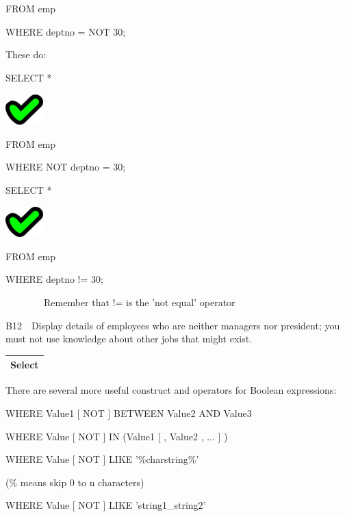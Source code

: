 FROM  emp

WHERE deptno = NOT 30;

These do:

SELECT  *

\begin{center}
  
\includegraphics[width=1.443cm,height=1.184cm]{images/img (27).png}

\end{center}
FROM  emp

WHERE NOT deptno = 30;

SELECT  *

\begin{center}
  
\includegraphics[width=1.443cm,height=1.184cm]{images/img (27).png}

\end{center}
FROM  emp

WHERE deptno != 30;

\ \ \ \ \ \ \ \ Remember that != is the 'not equal' operator 

B12\ \ Display details of employees who are neither managers nor president; you must not use knowledge about other jobs that might exist.

\begin{flushleft}
\tablefirsthead{}
\tablehead{}
\tabletail{}
\tablelasttail{}
\begin{supertabular}{|m{14.303cm}|}
\hline
Select 

\\\hline
\end{supertabular}
\end{flushleft}
There are several more useful construct and operators for Boolean expressions:

WHERE Value1 [ NOT ] BETWEEN Value2 AND Value3

WHERE Value  [ NOT ] IN (Value1 [ , Value2 , ... ] )

WHERE Value   [ NOT ] LIKE '\%charstring\%{}'

(\% means skip 0 to n characters) 

WHERE Value  [ NOT ] LIKE 'string1\_string2{}'

